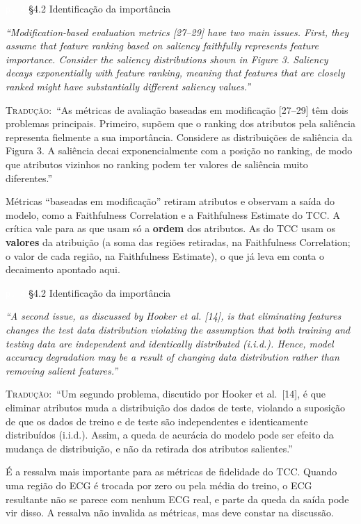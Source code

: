 \documentclass[11pt,a4paper]{article}
\newcommand{\pagechip}[1]{{\setlength{\fboxsep}{1.5pt}\colorbox{cAcc}{\textcolor{white}{\scriptsize\texttt{#1}}}}}
\newenvironment{origquote}{\par\itshape\small}{\par}
\newenvironment{tradquote}{\par\small\textsc{Tradução:}\ }{\par}
\newcommand{\explab}[1]{\par\smallskip{\small\color{cAcc}\textbf{\MakeUppercase{#1}}}\par}
\begin{document}
\begin{citacard}{\pagechip{p. 4} §4.2 Identificação da importância}
\begin{origquote}“Modification-based evaluation metrics [27–29] have two main issues. First, they assume that feature ranking based on saliency faithfully represents feature importance. Consider the saliency distributions shown in Figure 3. Saliency decays exponentially with feature ranking, meaning that features that are closely ranked might have substantially different saliency values.”\end{origquote}
\begin{tradquote}“As métricas de avaliação baseadas em modificação [27–29] têm dois problemas principais. Primeiro, supõem que o ranking dos atributos pela saliência representa fielmente a sua importância. Considere as distribuições de saliência da Figura 3. A saliência decai exponencialmente com a posição no ranking, de modo que atributos vizinhos no ranking podem ter valores de saliência muito diferentes.”\end{tradquote}
\explab{Explicação}
Métricas “baseadas em modificação” retiram atributos e observam a saída do modelo, como a Faithfulness Correlation e a Faithfulness Estimate do TCC. A crítica vale para as que usam só a \textbf{ordem} dos atributos. As do TCC usam os \textbf{valores} da atribuição (a soma das regiões retiradas, na Faithfulness Correlation; o valor de cada região, na Faithfulness Estimate), o que já leva em conta o decaimento apontado aqui.
\end{citacard}

\begin{citacard}{\pagechip{p. 4} §4.2 Identificação da importância}
\begin{origquote}“A second issue, as discussed by Hooker et al. [14], is that eliminating features changes the test data distribution violating the assumption that both training and testing data are independent and identically distributed (i.i.d.). Hence, model accuracy degradation may be a result of changing data distribution rather than removing salient features.”\end{origquote}
\begin{tradquote}“Um segundo problema, discutido por Hooker et al.\ [14], é que eliminar atributos muda a distribuição dos dados de teste, violando a suposição de que os dados de treino e de teste são independentes e identicamente distribuídos (i.i.d.). Assim, a queda de acurácia do modelo pode ser efeito da mudança de distribuição, e não da retirada dos atributos salientes.”\end{tradquote}
\explab{Explicação}
É a ressalva mais importante para as métricas de fidelidade do TCC. Quando uma região do ECG é trocada por zero ou pela média do treino, o ECG resultante não se parece com nenhum ECG real, e parte da queda da saída pode vir disso. A ressalva não invalida as métricas, mas deve constar na discussão.
\end{citacard}
\end{document}
